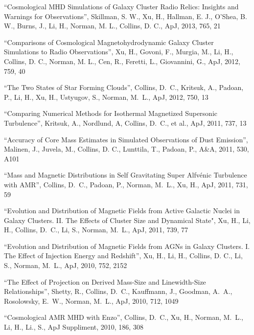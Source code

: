 \medskip
\noindent
``Cosmological MHD Simulations of Galaxy Cluster Radio Relics: Insights and Warnings for Observations'', 
Skillman, S. W., Xu, H., Hallman, E. J., O’Shea, B. W., Burns, J., Li, H., Norman, M. L., Collins, D. C.,
ApJ, 2013, 765, 21

\medskip
\noindent
``Comparisons of Cosmological Magnetohydrodynamic Galaxy Cluster Simulations to Radio Observations'', 
Xu, H., Govoni, F., Murgia, M., Li, H., Collins, D. C., Norman, M. L., Cen, R., Feretti, L., Giovannini, G.,
ApJ, 2012, 759, 40

\medskip
\noindent
``The Two States of Star Forming Clouds'', 
Collins, D.~C., Kritsuk, A., Padoan, P., Li, H., Xu, H., Ustyugov, S., Norman, M.~L.,
ApJ, 2012, 750, 13


\medskip
\noindent
``Comparing Numerical Methods for Isothermal Magnetized Supersonic Turbulence'', 
Kritsuk, A., Nordlund, A, Collins, D.~C., et al.,
ApJ, 2011, 737, 13

\medskip
\noindent
``Accuracy of Core Mass Estimates in Simulated Observations of Dust Emission'', 
Malinen, J., Juvela, M., Collins, D. C., Lunttila, T., Padoan, P.,
A\&A, 2011, 530, A101

\medskip
\noindent
``Mass and Magnetic Distributions in Self Gravitating Super Alfv\' enic Turbulence with AMR'', 
Collins, D.~C., Padoan, P., Norman, M.~L., Xu, H.,
ApJ, 2011, 731, 59

\medskip
\noindent
``Evolution and Distribution of Magnetic Fields from Active Galactic Nuclei in Galaxy Clusters. II. The Effects of Cluster Size and Dynamical State",
Xu, H., Li, H., Collins, D.~C., Li, S., Norman, M.~L.,
ApJ, 2011, 739, 77

\medskip
\noindent
``Evolution and Distribution of Magnetic Fields from AGNs in Galaxy Clusters.  I.  The Effect of Injection Energy and Redshift'', 
Xu, H., Li, H., Collins, D. C., Li, S., Norman, M.~L.,
ApJ, 2010, 752, 2152

\medskip
\noindent
``The Effect of Projection on Derived Mass-Size and Linewidth-Size Relationships'', 
Shetty, R., Collins, D.~C.,  Kauffmann, J.,  Goodman, A.~A.,  Rosolowsky, E.~W.,  Norman, M.~L., 
ApJ, 2010, 712, 1049

\medskip
\noindent
``Cosmological AMR MHD with Enzo'', 
Collins, D.~C., Xu, H., Norman, M.~L., Li, H., Li., S.,
ApJ Suppliment, 2010, 186, 308

